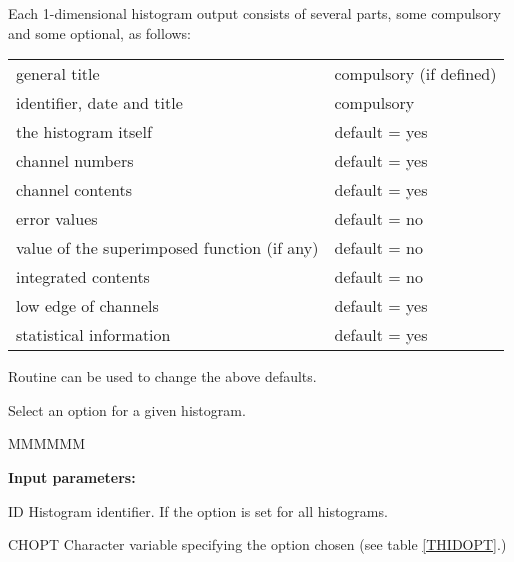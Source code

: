 Each 1-dimensional histogram output consists of several parts, some
compulsory and some optional, as follows:
\begin{center}
\begin{tabular}{|l@{\qquad}l|}
\hline
general title                              & compulsory (if defined)\\
identifier, date and title                 & compulsory             \\
the histogram itself                       & default = yes          \\
channel numbers                            & default = yes          \\
channel contents                           & default = yes          \\
error values                               & default = no           \\
value of the superimposed function (if any)& default = no           \\
integrated contents                        & default = no           \\
low edge of channels                       & default = yes          \\
statistical information                    & default = yes          \\
\hline
\end{tabular}
\end{center}
 
Routine  can be used to change the above defaults.
 
 
\Action Select an option for a given histogram.
 
\begin{DLtt}{MMMMMM}
\item[{\rm\bf Input parameters:}]
\item[ID]     Histogram identifier.
              If  the option is set for all histograms.
\item[CHOPT]  Character variable specifying the option chosen 
              (see table \ref{THIDOPT}.)
\end{DLtt}

